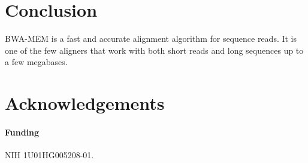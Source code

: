 \documentclass{bioinfo}
\begin{document}
\section{Conclusion}

BWA-MEM is a fast and accurate alignment algorithm for sequence reads. It is
one of the few aligners that work with both short reads and long sequences up
to a few megabases.

\section{Acknowledgements}
\paragraph{Funding\textcolon} NIH 1U01HG005208-01.

\end{document}
